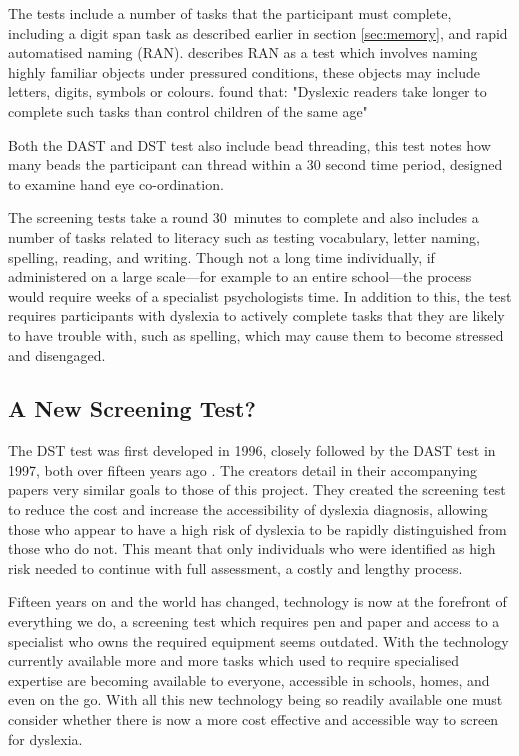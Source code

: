 \documentclass[journal]{IEEEtran}
\begin{document}
The tests include a number of tasks that the participant must complete, including a digit span task as described earlier in section \ref{sec:memory}, and rapid automatised naming (RAN).
\cite{snowling} describes RAN as a test which involves naming highly familiar objects 
under pressured conditions, these objects may include letters, digits, symbols or colours. \cite{snowling} found that:
 "Dyslexic readers take longer to complete such tasks than control children of the same age"
 
Both the DAST and DST test also include bead threading, this test notes how many beads the participant can thread within a 30 second time period, designed to examine hand eye co-ordination\cite{motorskills}.

The screening tests take a round 30~minutes to complete and also includes a number of tasks related to literacy such as testing vocabulary, letter naming, spelling, reading, and writing\cite{screeningTests}. Though not a long time individually, if administered on a large scale---for example to an entire school---the process would require weeks of a specialist psychologists time. In addition to this, the test requires participants with dyslexia to actively complete tasks that they are likely to have trouble with, such as spelling, which may cause them to become stressed and disengaged. 

\subsection{A New Screening Test?}
The DST test was first developed in 1996, closely followed by the DAST test in 1997, both over fifteen years ago \cite{dastTest, dstTest}. The creators detail in their accompanying papers very similar goals to those of this project. They created the screening test to reduce the cost and increase the accessibility of dyslexia diagnosis, allowing those who appear to have a high risk of dyslexia to be rapidly distinguished from those who do not. This meant that only individuals who were identified as high risk needed to continue with full assessment, a costly and lengthy process.

Fifteen years on and the world has changed, technology is now at the forefront of everything we do, a screening test which requires pen and paper and access to a specialist who owns the required equipment seems outdated. 
With the technology currently available more and more tasks which used to require specialised expertise are becoming available to everyone, accessible in schools, homes, and even on the go. With all this new technology being so readily available one must consider whether there is now a more cost effective and accessible way to screen for dyslexia.
\end{document}
